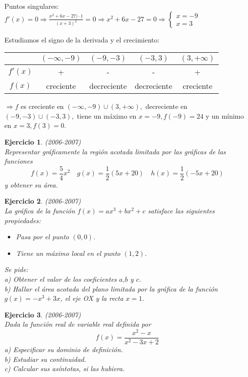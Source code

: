 \documentclass[12pt, a4paper]{amsart}
\newtheorem{ejer}{Ejercicio}
\newcommand{\n}{\color[rgb]{0,0,0}}
\begin{document}
Puntos singulares: $f'(x)=0 \Rightarrow \frac{x^2+6x-27)\cdot 1}{(x+3)^2}=0 \Rightarrow x^2+6x-27=0 \Rightarrow \left \{ \begin{matrix}
 x=-9\\ x=3
\end{matrix}\right.$

Estudiamos el signo de la derivada y el crecimiento:\\

\begin{center}
\begin{tabular}{c|cccc}
        & $(-\infty,-9)$ & $(-9,-3)$ & $(-3,3)$    & $(3,+\infty)$ \\ \hline
$f'(x)$ & +                                      & -                                 & -           & +             \\
$f(x)$  & creciente                              & decreciente                       & decreciente & creciente    
\end{tabular}
\end{center}



$\Rightarrow f$ es creciente en $(-\infty,-9)\cup(3,+\infty),$ decreciente en $(-9,-3)\cup(-3,3),$ tiene un máximo en $x=-9, f(-9)=24$ y un mínimo en $x=3, f(3)=0.$

\n
\vspace*{1cm}

\begin{ejer}\em (2006-2007)\\
Representar gráficamente la región acotada limitada por las gráficas de las funciones
$$
f(x)=\frac{5}{4}x^2 \quad g(x)=\frac{1}{2}(5x+20) \quad h(x)=\frac{1}{2}(-5x+20)
$$
y obtener su área.
\end{ejer}

\begin{ejer}\em (2006-2007)\\
La gráfica de la función $f(x)=ax^3+bx^2+c$ satisface las siguientes propiedades:
\begin{itemize}
\item[$\circ$] Pasa por el punto $(0,0)$.
\item[$\circ$] Tiene un máximo local en el punto $(1,2)$.
\end{itemize}
Se pide:\\
a) Obtener el valor de los coeficientes $a$,$b$ y $c$.\\
b) Hallar el área acotada del plano limitada por la gráfica de la función $g(x)=-x^3+3x$, el eje OX y la recta $x=1$.
\end{ejer}

\begin{ejer}\em (2006-2007)\\
Dada la función real de variable real definida por
$$
f(x)=\frac{x^2-x}{x^2-3x+2}
$$
a) Especificar su dominio de definición.\\
b) Estudiar su continuidad.\\
c) Calcular sus asíntotas, si las hubiera.
\end{ejer}
\end{document}
